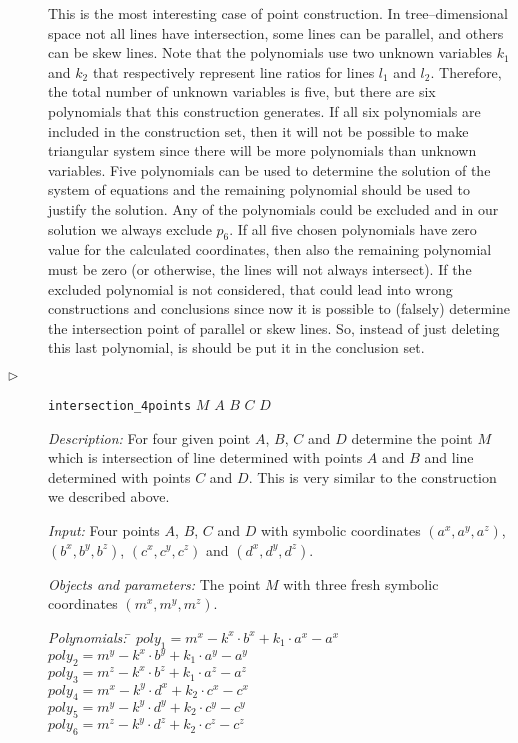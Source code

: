 \documentclass{aicom2e}
\begin{document}
\begin{description}
This is the most interesting case of point construction. In
tree--dimensional space not all lines have intersection, some lines
can be parallel, and others can be skew lines. Note that the
polynomials use two unknown variables $k_1$ and $k_2$ that
respectively represent line ratios for lines $l_1$ and
$l_2$. Therefore, the total number of unknown variables is five, but
there are six polynomials that this construction generates. If all six
polynomials are included in the construction set, then it will not be
possible to make triangular system since there will be more
polynomials than unknown variables. Five polynomials can be used to
determine the solution of the system of equations and the remaining
polynomial should be used to justify the solution. Any of the
polynomials could be excluded and in our solution we always exclude
$p_6$. If all five chosen polynomials have zero value for the
calculated coordinates, then also the remaining polynomial must be
zero (or otherwise, the lines will not always intersect). If the
excluded polynomial is not considered, that could lead into wrong
constructions and conclusions since now it is possible to (falsely)
determine the intersection point of parallel or skew lines. So,
instead of just deleting this last polynomial, is should be put it in
the conclusion set.

\item[$\triangleright$] {\tt intersection\_4points} $M$ $A$ $B$ $C$ $D$

  {\em Description:} For four given point $A$, $B$, $C$ and $D$
  determine the point $M$ which is intersection of line determined
  with points $A$ and $B$ and line determined with points $C$ and
  $D$. This is very similar to the construction we described above.

  {\em Input:} Four points $A$, $B$, $C$ and $D$ with symbolic
  coordinates $(a^x, a^y, a^z)$, $(b^x, b^y, b^z)$, $(c^x, c^y, c^z)$
  and $(d^x, d^y, d^z)$.

  {\em Objects and parameters:} The point $M$ with three fresh
  symbolic coordinates $(m^x, m^y, m^z)$.

\begin{tabbing}
{\em Polynomials:} \= $poly_1 = m^x - k^x\cdot b^x + k_1\cdot a^x - a^x$ \\
                   \> $poly_2 = m^y - k^x\cdot b^y + k_1\cdot a^y - a^y$ \\
                   \> $poly_3 = m^z - k^x\cdot b^z + k_1\cdot a^z - a^z$ \\
                   \> $poly_4 = m^x - k^y\cdot d^x + k_2\cdot c^x - c^x$ \\
                   \> $poly_5 = m^y - k^y\cdot d^y + k_2\cdot c^y - c^y$ \\
                   \> $poly_6 = m^z - k^y\cdot d^z + k_2\cdot c^z - c^z$
\end{tabbing}


\end{description}
\end{document}
